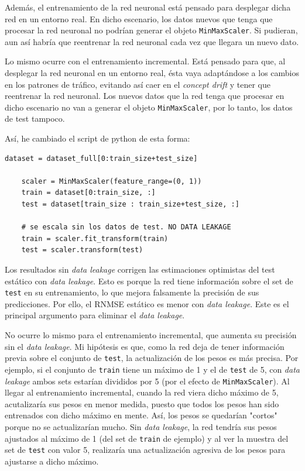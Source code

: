 \documentclass{article}
\begin{document}
Además, el entrenamiento de la red neuronal está pensado para desplegar dicha red en un entorno real. En dicho escenario, los datos nuevos que tenga que procesar la red neuronal no podrían generar el objeto \texttt{MinMaxScaler}. Si pudieran, aun así habría que reentrenar la red neuronal cada vez que llegara un nuevo dato.

Lo mismo ocurre con el entrenamiento incremental. Está pensado para que, al desplegar la red neuronal en un entorno real, ésta vaya adaptándose a los cambios en los patrones de tráfico, evitando así caer en el \textit{concept drift} y tener que reentrenar la red neuronal. Los nuevos datos que la red tenga que procesar en dicho escenario no van a generar el objeto \texttt{MinMaxScaler}, por lo tanto, los datos de test tampoco.

Así, he cambiado el script de python de esta forma:

\begin{lstlisting}[style=pythonstyle, caption={Escalado del dataset sin data leakage}]
    dataset = dataset_full[0:train_size+test_size]

    scaler = MinMaxScaler(feature_range=(0, 1))
    train = dataset[0:train_size, :]
    test = dataset[train_size : train_size+test_size, :]

    # se escala sin los datos de test. NO DATA LEAKAGE
    train = scaler.fit_transform(train)
    test = scaler.transform(test)
\end{lstlisting}

Los resultados sin \textit{data leakage} corrigen las estimaciones optimistas del test estático con \textit{data leakage}. Esto es porque la red tiene información sobre el set de \texttt{test} en su entrenamiento, lo que mejora falsamente la precisión de sus predicciones. Por ello, el RNMSE estático es menor con \textit{data leakage}. Este es el principal argumento para eliminar el \textit{data leakage}.

No ocurre lo mismo para el entrenamiento incremental, que aumenta su precisión sin el \textit{data leakage}. Mi hipótesis es que, como la red deja de tener información previa sobre el conjunto de \texttt{test}, la actualización de los pesos es más precisa. Por ejemplo, si el conjunto de \texttt{train} tiene un máximo de 1 y el de \texttt{test} de 5, con \textit{data leakage} ambos sets estarían divididos por 5 (por el efecto de \texttt{MinMaxScaler}). Al llegar al entrenamiento incremental, cuando la red viera dicho máximo de 5, acutalizaría sus pesos en menor medida, puesto que todos los pesos han sido entrenados con dicho máximo en mente. Así, los pesos se quedarían "cortos" porque no se actualizarían mucho. Sin \textit{data leakage}, la red tendría sus pesos ajustados al máximo de 1 (del set de \texttt{train} de ejemplo) y al ver la muestra del set de \texttt{test} con valor 5, realizaría una actualización agresiva de los pesos para ajustarse a dicho máximo.
\end{document}
